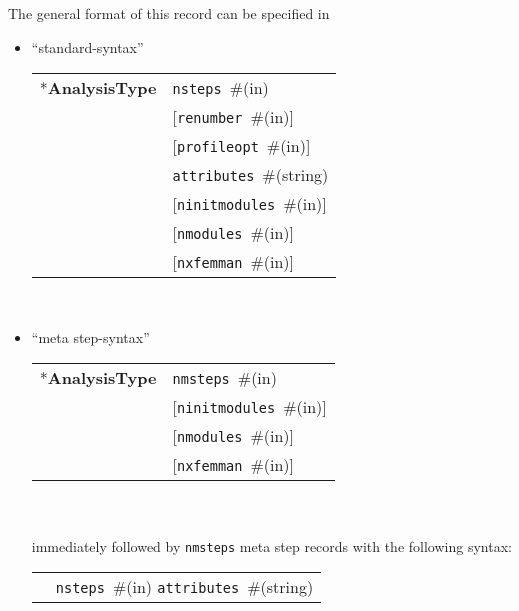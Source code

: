 \documentclass[a4paper]{report}
\newcommand{\param}[1]{\texttt{#1}} %
\newcommand{\optional}[1]{[#1]} %
\newcommand{\field}[2]{\param{#1}~\#{\tiny(#2)}} %
\newcommand{\optField}[2]{\optional{\field{#1}{#2}}}
\newcommand{\entKeyword}[1]{*\textbf{#1}} %
\newenvironment{record}[1][]{\begin{tabular}{|ll}}{\end{tabular}\\}
\newcommand{\recentry}[2]{{#1}&{#2}\\}
\newcounter{rcc}
\newenvironment{record}[1][\textwidth]{\setcounter{rcc}{0}\rowcolors{1}{lightgray}{lightgray}\tabularx{#1}{llR} \hline}
               {\endtabularx}
\newcommand{\recentry}[2]{\ifthenelse{\value{rcc}>0}{$\backslash$ \\}{\setcounter{rcc}{1}}{#1}&{#2}&}
\begin{document}
The general format of this record can be specified in
\begin{itemize}
\item ``standard-syntax''\\
  \begin{record}[0.9\textwidth]
    \recentry{\entKeyword{AnalysisType}}{\field{nsteps}{in}}
    \recentry{}{\optField{renumber}{in}}
    \recentry{}{\optField{profileopt}{in}}
    \recentry{}{\field{attributes}{string}}
    \recentry{}{\optField{ninitmodules}{in}}
    \recentry{}{\optField{nmodules}{in}}
    \recentry{}{\optField{nxfemman}{in}}
  \end{record}
\item ``meta step-syntax''\\
  \begin{record}[0.9\textwidth]
    \recentry{\entKeyword{AnalysisType}}{\field{nmsteps}{in}}
    \recentry{}{\optField{ninitmodules}{in}}
    \recentry{}{\optField{nmodules}{in}}
    \recentry{}{\optField{nxfemman}{in}}
  \end{record}\\
  immediately followed by \param{nmsteps} meta step records with the following syntax:\\
  \begin{record}[0.9\textwidth]
    \recentry{}{\field{nsteps}{in} \field{attributes}{string}}
  \end{record}\\
  

\end{itemize}
\end{document}
